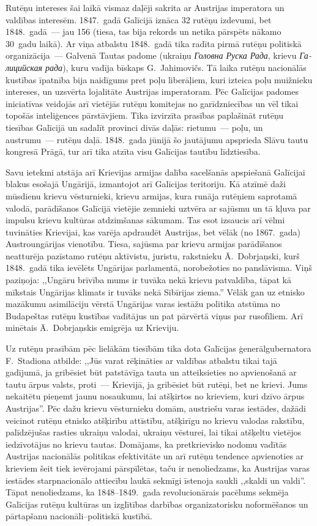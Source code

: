 \documentclass[twoside,a5paper,12pt,fleqn,openany]{extbook}
\newcommand{\rutxti}[1]{\textit{\textrussian{#1}}}
\newcommand{\uktxti}[1]{\textit{\textukrainian{#1}}}
\begin{document}
Rutēņu intereses šai laikā vismaz daļēji sakrita ar Austrijas imperatora un valdības interesēm. 1847.~gadā Galīcijā iznāca 32 rutēņu izdevumi, bet 1848.~gadā~--- jau 156 (tiesa, tas bija rekords un netika pārspēts nākamo 30~gadu laikā). Ar viņa atbalstu 1848.~gadā tika radīta pirmā rutēņu politiskā organizācija~--- Galvenā Tautas padome (ukraiņu \uktxti{Головна Руска Рада}, krievu \rutxti{Галицийская рада}), kuru vadīja bīskaps G.~Jahimovičs. Tā laika rutēņu nacionālās kustības īpatnība bija naidīgums pret poļu liberāļiem, kuri izteica poļu muižnieku intereses, un uzsvērta lojalitāte Austrijas imperatoram. Pēc Galīcijas padomes iniciatīvas veidojās arī vietējās rutēņu komitejas no garīdzniecības un vēl tikai topošās inteliģences pārstāvjiem. Tika izvirzīta prasības paplašināt rutēņu tiesības Galīcijā un sadalīt provinci divās daļās: rietumu~--- poļu, un austrumu~--- rutēņu daļā. 1848.~gada jūnijā šo jautājumu apsprieda Slāvu tautu kongresā Prāgā, tur arī tika atzīta visu Galīcijas tautību līdztiesība.

Savu ietekmi atstāja arī Krievijas armijas dalība sacelšanās apspiešanā Galīcijai blakus esošajā Ungārijā, izmantojot arī Galīcijas teritoriju. Kā atzīmē daži mūsdienu krievu vēsturnieki, krievu armijas, kura runāja rutēņiem saprotamā valodā, parādīšanos Galīcijā vietējie zemnieki uztvēra ar sajūsmu un tā kļuva par impulsu krievu kultūras atdzimšanas sākumam. Tas esot izsaucis arī vēlmi tuvināties Krievijai, kas varēja apdraudēt Austrijas, bet vēlāk (no 1867.~gada) Austroungārijas vienotību. Tiesa, sajūsma par krievu armijas parādīšanos neatturēja pazīstamo rutēņu aktīvistu, juristu, rakstnieku Ā.~Dobrjaņski, kurš 1848.~gadā tika ievēlēts Ungārijas parlamentā, norobežoties no panslāvisma. Viņš paziņoja: ,,Ungāru brīvība mums ir tuvāka nekā krievu patvaldība, tāpat kā mīkstais Ungārijas klimats ir tuvāks nekā Sibīrijas ziema.'' Vēlāk gan uz etnisko mazākumu asimilāciju vērstā Ungārijas varas iestāžu politika atstūma no Budapeštas rutēņu kustības vadītājus un pat pārvērtā viņus par rusofīliem. Arī minētais Ā.~Dobrjaņskis emigrēja uz Krieviju.

Uz rutēņu prasībām pēc lielākām tiesībām tika dota Galīcijas ģenerālgubernatora F.~Stadiona atbilde: ,,Jūs varat rēķināties ar valdības atbalstu tikai tajā gadījumā, ja gribēsiet būt patstāvīga tauta un atteiksieties no apvienošanā ar tautu ārpus valsts, proti~--- Krievijā, ja gribēsiet būt rutēņi, bet ne krievi. Jums nekaitētu pieņemt jaunu nosaukumu, lai atšķirtos no krieviem, kuri dzīvo ārpus Austrijas''. Pēc dažu krievu vēsturnieku domām, austriešu varas iestādes, dažādi veicinot rutēņu etnisko atšķirību attīstību, atšķirīgu no krievu valodas rakstību, palīdzējušas rasties ukraiņu valodai, ukraiņu vēsturei, lai tikai atšķeltu vietējos iedzīvotājus no krievu tautas. Domājams, ka pretkrievisko nodomu vadītās Austrijas nacionālās politikas efektivitāte un arī rutēņu tendence apvienoties ar krieviem šeit tiek ievērojami pārspīlētas, taču ir nenoliedzams, ka Austrijas varas iestādes starpnacionālo attiecību laukā sekmīgi īstenoja saukli ,,skaldi un valdi''. Tāpat nenoliedzams, ka 1848--1849.~gada revolucionārais pacēlums sekmēja Galīcijas rutēņu kultūras un izglītības darbības organizatorisku noformēšanos un pārtapšanu nacionāli--politiskā kustībā.
\end{document}
